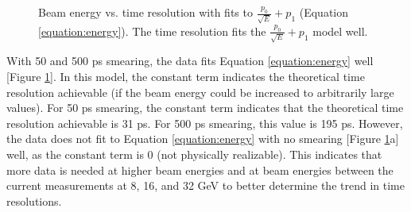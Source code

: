 \documentclass[twocolumn,aps,prd,reprint]{revtex4-1}
\begin{document}
\begin{figure}[!htbp]
\centering
{}
\caption{Beam energy vs. time resolution with fits to $\frac{p_0}{\sqrt{E}} + p_1$ (Equation \ref{equation:energy}). The time resolution fits the $\frac{p_0}{\sqrt{E}} + p_1$ model well.}
\label{energy fits}
\end{figure}

With 50 and 500 ps smearing, the data fits Equation \ref{equation:energy} well [Figure \ref{energy fits}]. In this model, the constant term indicates the theoretical time resolution achievable (if the beam energy could be increased to arbitrarily large values). For 50 ps smearing, the constant term indicates that the theoretical time resolution achievable is 31 ps. For 500 ps smearing, this value is 195 ps. However, the data does not fit to Equation \ref{equation:energy} with no smearing [Figure \ref{energy fits}a] well, as the constant term is 0 (not physically realizable). This indicates that more data is needed at higher beam energies and at beam energies between the current measurements at 8, 16, and 32 GeV to better determine the trend in time resolutions.
\end{document}
